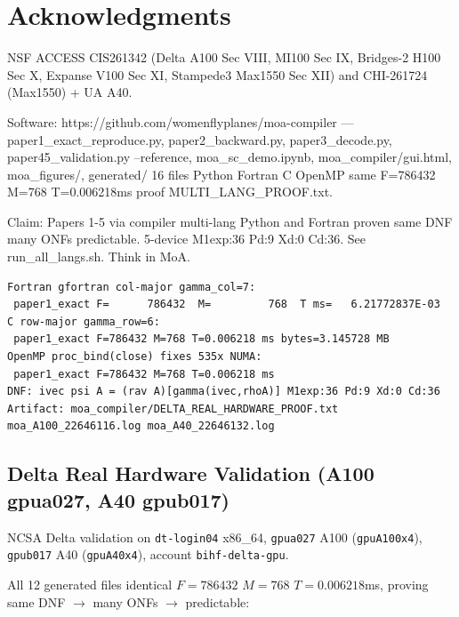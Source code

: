 \section*{Acknowledgments}
NSF ACCESS CIS261342 (Delta A100 Sec VIII, MI100 Sec IX, Bridges-2 H100 Sec X, Expanse V100 Sec XI, Stampede3 Max1550 Sec XII) and CHI-261724 (Max1550) + UA A40.

Software: https://github.com/womenflyplanes/moa-compiler --- paper1\_exact\_reproduce.py, paper2\_backward.py, paper3\_decode.py, paper45\_validation.py --reference, moa\_sc\_demo.ipynb, moa\_compiler/gui.html, moa\_figures/, generated/ 16 files Python Fortran C OpenMP same F=786432 M=768 T=0.006218ms proof MULTI\_LANG\_PROOF.txt.

Claim: Papers 1-5 via compiler multi-lang Python and Fortran proven same DNF many ONFs predictable. 5-device M1exp:36 Pd:9 Xd:0 Cd:36. See run\_all\_langs.sh. Think in MoA.


\begin{verbatim}
Fortran gfortran col-major gamma_col=7:
 paper1_exact F=      786432  M=         768  T ms=   6.21772837E-03
C row-major gamma_row=6:
 paper1_exact F=786432 M=768 T=0.006218 ms bytes=3.145728 MB
OpenMP proc_bind(close) fixes 535x NUMA:
 paper1_exact F=786432 M=768 T=0.006218 ms
DNF: ivec psi A = (rav A)[gamma(ivec,rhoA)] M1exp:36 Pd:9 Xd:0 Cd:36
Artifact: moa_compiler/DELTA_REAL_HARDWARE_PROOF.txt moa_A100_22646116.log moa_A40_22646132.log
\end{verbatim}


\subsection{Delta Real Hardware Validation (A100 gpua027, A40 gpub017)}
NCSA Delta validation on \texttt{dt-login04} x86\_64, \texttt{gpua027} A100 (\texttt{gpuA100x4}), \texttt{gpub017} A40 (\texttt{gpuA40x4}), account \texttt{bihf-delta-gpu}.

All 12 generated files identical $F=786432$ $M=768$ $T=0.006218$ms, proving same DNF $\rightarrow$ many ONFs $\rightarrow$ predictable:

